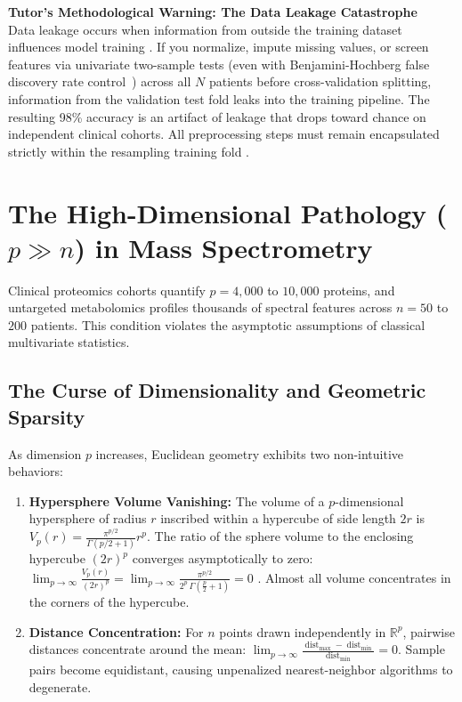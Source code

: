 \documentclass[11pt,oneside]{book}
\begin{document}
\begin{notebox}
\textbf{Tutor's Methodological Warning: The Data Leakage Catastrophe}\\
Data leakage occurs when information from outside the training dataset influences model training \cite{ambroise2002selection, broadhurst2006statistical}. If you normalize, impute missing values, or screen features via univariate two-sample tests (even with Benjamini-Hochberg false discovery rate control~\cite{benjamini1995controlling}) across all $N$ patients before cross-validation splitting, information from the validation test fold leaks into the training pipeline. The resulting 98\% accuracy is an artifact of leakage that drops toward chance on independent clinical cohorts. All preprocessing steps must remain encapsulated strictly within the resampling training fold \cite{kuhn2022tidymodels}.
\end{notebox}

\clearpage

\section{The High-Dimensional Pathology (\texorpdfstring{$p \gg n$}{p >> n}) in Mass Spectrometry}

Clinical proteomics cohorts quantify $p = 4{,}000$ to $10{,}000$ proteins, and untargeted metabolomics profiles thousands of spectral features across $n = 50$ to $200$ patients. This condition violates the asymptotic assumptions of classical multivariate statistics.

\subsection{The Curse of Dimensionality and Geometric Sparsity}

As dimension $p$ increases, Euclidean geometry exhibits two non-intuitive behaviors:
\begin{enumerate}
    \setlength{\itemsep}{1pt}\setlength{\parskip}{0pt}\setlength{\parsep}{0pt}
    \item \textbf{Hypersphere Volume Vanishing:} The volume of a $p$-dimensional hypersphere of radius $r$ inscribed within a hypercube of side length $2r$ is $V_p(r) = \frac{\pi^{p/2}}{\Gamma(p/2 + 1)} r^p$. The ratio of the sphere volume to the enclosing hypercube $(2r)^p$ converges asymptotically to zero: $\lim_{p \to \infty} \frac{V_p(r)}{(2r)^p} = \lim_{p \to \infty} \frac{\pi^{p/2}}{2^p \, \Gamma\left(\frac{p}{2} + 1\right)} = 0$ \cite{hastie2009elements}. Almost all volume concentrates in the corners of the hypercube.
    
    \item \textbf{Distance Concentration:} For $n$ points drawn independently in $\mathbb{R}^p$, pairwise distances concentrate around the mean: $\lim_{p \to \infty} \frac{\operatorname{dist}_{\max} - \operatorname{dist}_{\min}}{\operatorname{dist}_{\min}} = 0$. Sample pairs become equidistant, causing unpenalized nearest-neighbor algorithms to degenerate.
\end{enumerate}
\end{document}
